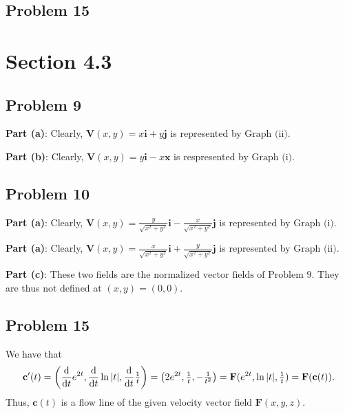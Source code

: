 \documentclass[11pt]{article}
\renewcommand{\vec}[1]{\mathbf{#1}}
\begin{document}

\subsection*{Problem 15}


\section{Section 4.3}


\subsection*{Problem 9}

\textbf{Part (a)}: Clearly, $\vec{V}(x, y) = x \vec{i} + y \vec{j}$ is represented by $\boxed{\text{Graph (ii)}}$.

\textbf{Part (b)}: Clearly, $\vec{V}(x, y) = y \vec{i} - x \vec{x}$ is respresented by $\boxed{\text{Graph (i)}}$.


\subsection*{Problem 10}

\textbf{Part (a)}: Clearly, $\vec{V}(x, y) = \tfrac{y}{\sqrt{x^{2} + y^{2}}} \vec{i} - \tfrac{x}{\sqrt{x^{2} + y^{2}}} \vec{j}$ is represented by $\boxed{\text{Graph (i)}}$.

\textbf{Part (a)}: Clearly, $\vec{V}(x, y) = \tfrac{x}{\sqrt{x^{2} + y^{2}}} \vec{i} + \tfrac{y}{\sqrt{x^{2} + y^{2}}} \vec{j}$ is represented by $\boxed{\text{Graph (ii)}}$.

\textbf{Part (c)}: These two fields are the $\boxed{\text{normalized vector fields of Problem $9$}}$. They are thus not defined at $\boxed{(x, y) = (0, 0)}$.


\subsection*{Problem 15} 

We have that
\[
	\vec{c}'(t) = \left( \dv{t} e^{2t}, \dv{t} \ln \abs{t}, \dv{t} \tfrac{1}{t} \right) = \left( 2 e^{2t}, \tfrac{1}{t}, -\tfrac{1}{t^{2}} \right) = \mathbf{F}(e^{2t}, \ln \abs{t}, \tfrac{1}{t}) = \mathbf{F}(\vec{c}(t)).
\]
Thus, $\vec{c}(t)$ is a flow line of the given velocity vector field $\mathbf{F}(x, y, z)$.
\end{document}
